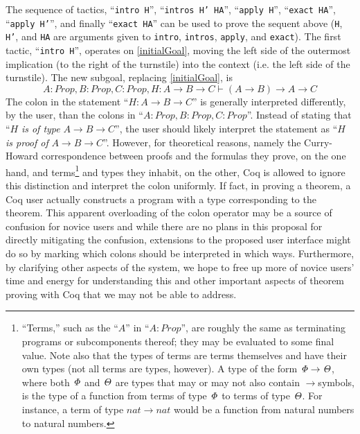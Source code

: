 \documentclass[11pt]{amsart}
\newcommand{\ra}{\ensuremath{\rightarrow}}
\begin{document}
The sequence of tactics, ``\texttt{intro H}'', ``\texttt{intros H' HA}'', ``\texttt{apply H}'', ``\texttt{exact HA}'', ``\texttt{apply H'}'', and finally ``\texttt{exact HA}'' can be used to prove the sequent above (\texttt{H}, \texttt{H'}, and \texttt{HA} are arguments given to \texttt{intro}, \texttt{intros}, \texttt{apply}, and \texttt{exact}).  The first tactic, ``\texttt{intro H}'', operates on \eqref{initialGoal}, moving the left side of the outermost implication (to the right of the turnstile) into the context (i.e. the left side of the turnstile).  The new subgoal, replacing \eqref{initialGoal}, is
\begin{equation}\label{introHResult}A : Prop, B : Prop, C : Prop, H : A \ra B \ra C \vdash (A \ra B) \ra A \ra C\end{equation}
The colon in the statement ``$H : A \ra B \ra C$'' is generally interpreted differently, by the user, than the colons in ``$A : Prop, B : Prop, C : Prop$''.  Instead of stating that ``$H$ \textit{is of type} $A \ra B \ra C$'', the user should likely interpret the statement as ``$H$ \textit{is proof of} $A \ra B \ra C$''.  However, for theoretical reasons, namely the Curry-Howard correspondence between proofs and the formulas they prove, on the one hand, and terms\footnote{``Terms,'' such as the ``$A$'' in ``$A : Prop$'', are roughly the same as terminating programs or subcomponents thereof; they may be evaluated to some final value.  Note also that the types of terms are terms themselves and have their own types (not all terms are types, however).  A type of the form $\it{\Phi} \ra \it{\Theta}$, where both $\it{\Phi}$ and $\it{\Theta}$ are types that may or may not also contain \ra symbols, is the type of a function from terms of type $\it{\Phi}$ to terms of type $\it{\Theta}$.  For instance, a term of type $nat \ra nat$ would be a function from natural numbers to natural numbers.} and types they inhabit, on the other, Coq is allowed to ignore this distinction and interpret the colon uniformly.  If fact, in proving a theorem, a Coq user actually constructs a program with a type corresponding to the theorem.  This apparent overloading of the colon operator may be a source of confusion for novice users and while there are no plans in this proposal for directly mitigating the confusion, extensions to the proposed user interface might do so by marking which colons should be interpreted in which ways.  Furthermore, by clarifying other aspects of the system, we hope to free up more of novice users' time and energy for understanding this and other important aspects of theorem proving with Coq that we may not be able to address. 
\end{document}
